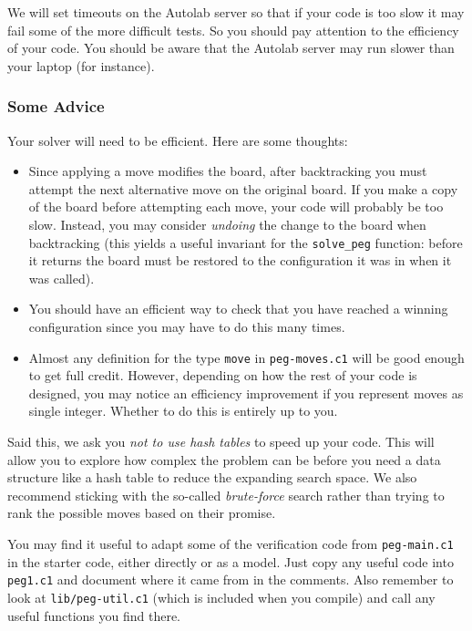 \documentclass[12pt]{exam}
\begin{document}
We will set timeouts on the Autolab server so that if your code is too
slow it may fail some of the more difficult tests.  So you should pay
attention to the efficiency of your code.  You should be aware that
the Autolab server may run slower than your laptop (for instance).


\subsubsection*{Some Advice}

Your solver will need to be efficient.  Here are some thoughts:
\begin{itemize}
\item%
  Since applying a move modifies the board, after backtracking you
  must attempt the next alternative move on the original board.  If
  you make a copy of the board before attempting each move, your code
  will probably be too slow.  Instead, you may consider \emph{undoing}
  the change to the board when backtracking (this yields a useful
  invariant for the \lstinline'solve_peg' function: before it returns
  the board must be restored to the configuration it was in when it
  was called).
\item%
  You should have an efficient way to check that you have reached a
  winning configuration since you may have to do this many times.
\item%
  Almost any definition for the type \lstinline'move' in
  \lstinline'peg-moves.c1' will be good enough to get full
  credit.  However, depending on how the rest of your code is designed,
  you may notice an efficiency improvement if you represent moves
  as single integer.  Whether to do this is entirely up to you.
\end{itemize}
Said this, we ask you \emph{not to use hash tables} to speed up your
code.  This will allow you to explore how complex the problem can be
before you need a data structure like a hash table to reduce the
expanding search space.  We also recommend sticking with the so-called
\emph{brute-force} search rather than trying to rank the possible
moves based on their promise.

You may find it useful to adapt some of the verification code
from \lstinline'peg-main.c1' in the starter code, either directly or
as a model.  Just copy any useful code into \lstinline'peg1.c1' and
document where it came from in the comments. Also remember to look at
\lstinline'lib/peg-util.c1' (which is included when you compile) and
call any useful functions you find there.
\end{document}
